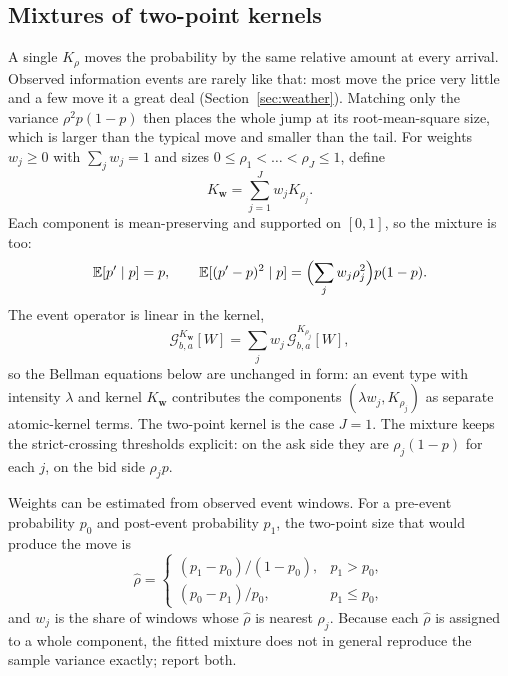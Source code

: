 \documentclass[11pt]{article}
\newcommand{\E}{\mathbb E}
\newcommand{\1}{\mathbf 1}
\newcommand{\G}{\mathcal G}
\begin{document}
\subsection{Mixtures of two-point kernels}
\label{sec:mixture}
A single $K_\rho$ moves the probability by the same relative amount at every
arrival. Observed information events are rarely like that: most move the price
very little and a few move it a great deal (Section~\ref{sec:weather}).
Matching only the variance $\rho^2p(1-p)$ then places the whole jump at its
root-mean-square size, which is larger than the typical move and smaller than
the tail. For weights $w_j\ge0$ with $\sum_jw_j=1$ and sizes
$0\le\rho_1<\dots<\rho_J\le1$, define
\begin{equation}
 K_{\mathbf w}=\sum_{j=1}^J w_jK_{\rho_j}.
 \label{eq:mixture}
\end{equation}
Each component is mean-preserving and supported on $[0,1]$, so the mixture is too:
\begin{equation}
 \E[p'\mid p]=p,\qquad
 \E[(p'-p)^2\mid p]=\Bigl(\sum_jw_j\rho_j^2\Bigr)p(1-p).
\end{equation}
The event operator is linear in the kernel,
\begin{equation}
 \G^{K_{\mathbf w}}_{b,a}[W]=\sum_jw_j\,\G^{K_{\rho_j}}_{b,a}[W],
\end{equation}
so the Bellman equations below are unchanged in form: an event type with
intensity $\lambda$ and kernel $K_{\mathbf w}$ contributes the components
$(\lambda w_j,K_{\rho_j})$ as separate atomic-kernel terms. The two-point kernel is
the case $J=1$. The mixture keeps the strict-crossing thresholds explicit: on
the ask side they are $\rho_j(1-p)$ for each $j$, on the bid side $\rho_jp$.

Weights can be estimated from observed event windows. For a pre-event
probability $p_0$ and post-event probability $p_1$, the two-point size that would
produce the move is
\begin{equation}
 \hat\rho=\begin{cases}(p_1-p_0)/(1-p_0),&p_1>p_0,\\(p_0-p_1)/p_0,&p_1\le p_0,\end{cases}
 \label{eq:rhohat}
\end{equation}
and $w_j$ is the share of windows whose $\hat\rho$ is nearest $\rho_j$. Because
each $\hat\rho$ is assigned to a whole component, the fitted mixture does not
in general reproduce the sample variance exactly; report both.
\end{document}
